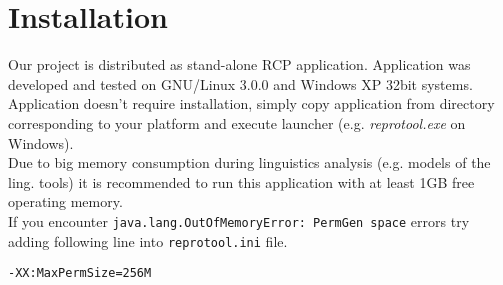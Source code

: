 \section{Installation}

Our project is distributed as stand-alone RCP application. Application was developed and tested on GNU/Linux 3.0.0 and Windows XP 32bit systems.\\

Application doesn't require installation, simply copy application from directory corresponding to your platform and execute launcher (e.g. \emph{reprotool.exe} on Windows).\\

Due to big memory consumption during linguistics analysis (e.g. models of the ling. tools) it is recommended to run this application with at least 1GB free operating memory.\\

If you encounter \verb|java.lang.OutOfMemoryError: PermGen space| errors try adding following line into \verb|reprotool.ini| file.

\begin{verbatim}
-XX:MaxPermSize=256M
\end{verbatim}

